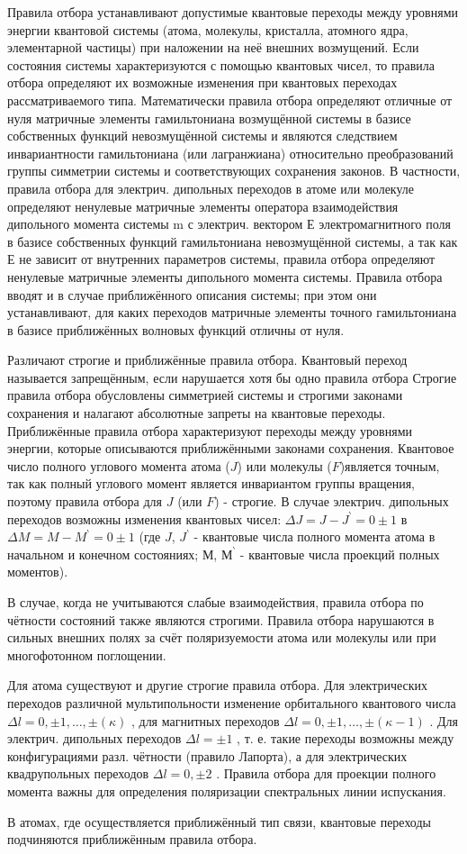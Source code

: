 \documentclass[a4paper,14pt,russian]{article}
\begin{document}
Правила отбора устанавливают допустимые квантовые переходы между уровнями энергии квантовой системы (атома, молекулы, кристалла, атомного ядра, элементарной частицы) при наложении на неё внешних возмущений. Если состояния системы характеризуются с помощью квантовых чисел, то правила отбора определяют их возможные изменения при квантовых переходах рассматриваемого типа. Математически правила отбора определяют отличные от нуля матричные элементы гамильтониана возмущённой системы в базисе собственных функций невозмущённой системы и являются следствием инвариантности гамильтониана (или лагранжиана) относительно преобразований группы симметрии системы и соответствующих сохранения законов. В частности, правила отбора для электрич. дипольных переходов в атоме или молекуле определяют ненулевые матричные элементы оператора взаимодействия дипольного момента системы m с электрич. вектором $Е$ электромагнитного поля в базисе собственных функций гамильтониана невозмущённой системы, а так как $Е$ не зависит от внутренних параметров системы, правила отбора определяют ненулевые матричные элементы дипольного момента системы. Правила отбора вводят и в случае приближённого описания системы; при этом они устанавливают, для каких переходов матричные элементы точного гамильтониана в базисе приближённых волновых функций отличны от нуля. 

Различают строгие и приближённые правила отбора. Квантовый переход называется запрещённым, если нарушается хотя бы одно правила отбора Строгие правила отбора обусловлены симметрией системы и строгими законами сохранения и налагают абсолютные запреты на квантовые переходы. Приближённые правила отбора характеризуют переходы между уровнями энергии, которые описываются приближёнными законами сохранения. Квантовое число полного углового момента атома ($J$) или молекулы ($F$)является точным, так как полный углового момент является инвариантом группы вращения, поэтому правила отбора для $J$ (или $F$) - строгие. В случае электрич. дипольных переходов возможны изменения квантовых чисел:
$
\Delta J = J - J ^\backprime = 0 \pm 1
$
в
$
\Delta M = M - M ^\backprime = 0 \pm 1
$
(где $J$, $J ^\backprime$ - квантовые числа полного момента атома в начальном и конечном состояниях; $М$, $М ^\backprime$ - квантовые числа проекций полных моментов).

В случае, когда не учитываются слабые взаимодействия, правила отбора по чётности состояний также являются строгими. Правила отбора нарушаются в сильных внешних полях за счёт поляризуемости атома или молекулы или при многофотонном поглощении.

Для атома существуют и другие строгие правила отбора. Для электрических переходов различной мультипольности изменение орбитального квантового числа 
$
\Delta l = 0, \pm 1, \ldots , \pm (\kappa) 
$
, для магнитных переходов
$
\Delta l = 0, \pm 1, \ldots , \pm (\kappa - 1)
$
. Для электрич. дипольных переходов
$
\Delta l = \pm 1
$
, т. е. такие переходы возможны между конфигурациями разл. чётности (правило Лапорта), а для электрических квадрупольных переходов
$
\Delta l = 0, \pm 2
$
. Правила отбора для проекции полного момента важны для определения поляризации спектральных линии испускания. 

В атомах, где осуществляется приближённый тип связи, квантовые переходы подчиняются приближённым правила отбора.
\end{document}

